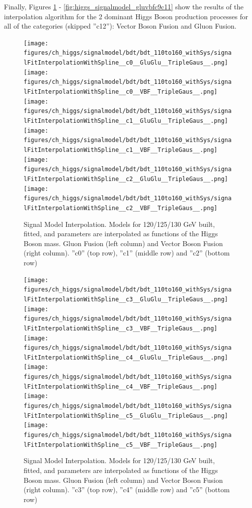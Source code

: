 Finally, Figures \ref{fig:higgs_signalmodel_gluvbfc0c2} - \ref{fig:higgs_signalmodel_gluvbfc9c11} show the results of the interpolation algorithm for the 2 dominant Higgs Boson production processes for all of the categories (skipped ''c12''): Vector Boson Fusion and Gluon Fusion.
\begin{figure}[htbp]
  \centering
  \texttt{[image: figures/ch\_higgs/signalmodel/bdt/bdt\_110to160\_withSys/signalFitInterpolationWithSpline\_\_c0\_\_GluGlu\_\_TripleGaus\_\_.png]}
  \texttt{[image: figures/ch\_higgs/signalmodel/bdt/bdt\_110to160\_withSys/signalFitInterpolationWithSpline\_\_c0\_\_VBF\_\_TripleGaus\_\_.png]}\\
  \texttt{[image: figures/ch\_higgs/signalmodel/bdt/bdt\_110to160\_withSys/signalFitInterpolationWithSpline\_\_c1\_\_GluGlu\_\_TripleGaus\_\_.png]}
  \texttt{[image: figures/ch\_higgs/signalmodel/bdt/bdt\_110to160\_withSys/signalFitInterpolationWithSpline\_\_c1\_\_VBF\_\_TripleGaus\_\_.png]}\\
  \texttt{[image: figures/ch\_higgs/signalmodel/bdt/bdt\_110to160\_withSys/signalFitInterpolationWithSpline\_\_c2\_\_GluGlu\_\_TripleGaus\_\_.png]}
  \texttt{[image: figures/ch\_higgs/signalmodel/bdt/bdt\_110to160\_withSys/signalFitInterpolationWithSpline\_\_c2\_\_VBF\_\_TripleGaus\_\_.png]}
  \caption{Signal Model Interpolation. Models for 120/125/130 GeV built, fitted, and parameters are interpolated as functions of the Higgs Boson mass. Gluon Fusion (left column) and Vector Boson Fusion (right column). ''c0'' (top row), ''c1'' (middle row) and ''c2'' (bottom row)}
  \label{fig:higgs_signalmodel_gluvbfc0c2}
\end{figure}
\begin{figure}[htbp]
  \centering
  \texttt{[image: figures/ch\_higgs/signalmodel/bdt/bdt\_110to160\_withSys/signalFitInterpolationWithSpline\_\_c3\_\_GluGlu\_\_TripleGaus\_\_.png]}
  \texttt{[image: figures/ch\_higgs/signalmodel/bdt/bdt\_110to160\_withSys/signalFitInterpolationWithSpline\_\_c3\_\_VBF\_\_TripleGaus\_\_.png]}\\
  \texttt{[image: figures/ch\_higgs/signalmodel/bdt/bdt\_110to160\_withSys/signalFitInterpolationWithSpline\_\_c4\_\_GluGlu\_\_TripleGaus\_\_.png]}
  \texttt{[image: figures/ch\_higgs/signalmodel/bdt/bdt\_110to160\_withSys/signalFitInterpolationWithSpline\_\_c4\_\_VBF\_\_TripleGaus\_\_.png]}\\
  \texttt{[image: figures/ch\_higgs/signalmodel/bdt/bdt\_110to160\_withSys/signalFitInterpolationWithSpline\_\_c5\_\_GluGlu\_\_TripleGaus\_\_.png]}
  \texttt{[image: figures/ch\_higgs/signalmodel/bdt/bdt\_110to160\_withSys/signalFitInterpolationWithSpline\_\_c5\_\_VBF\_\_TripleGaus\_\_.png]}
  \caption{Signal Model Interpolation. Models for 120/125/130 GeV built, fitted, and parameters are interpolated as functions of the Higgs Boson mass. Gluon Fusion (left column) and Vector Boson Fusion (right column). ''c3'' (top row), ''c4'' (middle row) and ''c5'' (bottom row)}
  \label{fig:higgs_signalmodel_gluvbfc3c5}
\end{figure}
